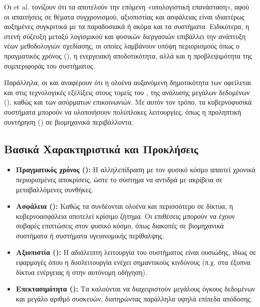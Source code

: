 Οι  et al. \cite{Rajkumar2010} τονίζουν ότι τα  αποτελούν την επόμενη
«υπολογιστική επανάσταση», αφού οι απαιτήσεις σε θέματα συγχρονισμού, αξιοπιστίας και
ασφάλειας είναι ιδιαιτέρως αυξημένες συγκριτικά με τα παραδοσιακά  ή ακόμα και τα
 συστήματα. Ειδικότερα, η στενή σύζευξη μεταξύ λογισμικού και φυσικών διεργασιών
επιβάλλει την ανάπτυξη νέων μεθοδολογιών σχεδίασης, οι οποίες λαμβάνουν υπόψη περιορισμούς
όπως ο πραγματικός χρόνος (), η ενεργειακή αποδοτικότητα, αλλά και η
προβλεψιμότητα της συμπεριφοράς του συστήματος.

Παράλληλα, οι  και  \cite{Baheti2011} αναφέρουν ότι η ολοένα αυξανόμενη
δημοτικότητα των  οφείλεται και στις τεχνολογικές εξελίξεις στους τομείς του
, της ανάλυσης μεγάλων δεδομένων (), καθώς και των
ασύρματων επικοινωνιών. Με αυτόν τον τρόπο, τα κυβερνοφυσικά συστήματα μπορούν να
υλοποιήσουν πολύπλοκες λειτουργίες, όπως η προληπτική συντήρηση ()
σε βιομηχανικά περιβάλλοντα.

\subsection*{Βασικά Χαρακτηριστικά και Προκλήσεις}

\begin{itemize}
    \item \textbf{Πραγματικός χρόνος ():} Η αλληλεπίδραση με τον φυσικό κόσμο
    απαιτεί χρονικά περιορισμένες αποκρίσεις, ώστε το σύστημα να αντιδρά με ακρίβεια σε
    μεταβαλλόμενες συνθήκες.
    \item \textbf{Ασφάλεια ():} Καθώς τα  συνδέονται ολοένα και περισσότερο
    σε δίκτυα, η κυβερνοασφάλεια αποτελεί κρίσιμο ζήτημα. Οι επιθέσεις μπορούν να έχουν
    σοβαρές επιπτώσεις στον φυσικό κόσμο, όπως διακοπές σε βιομηχανικά συστήματα ή
    συστήματα υγειονομικής περίθαλψης.
    \item \textbf{Αξιοπιστία ():} Η αδιάλειπτη λειτουργία του συστήματος
    είναι ουσιώδης, ιδίως σε εφαρμογές όπου η δυσλειτουργία ενέχει σημαντικούς κινδύνους
    (π.χ. στα έξυπνα δίκτυα ενέργειας ή στην αυτόνομη οδήγηση).
    \item \textbf{Επεκτασιμότητα ():} Τα  καλούνται να διαχειριστούν
    μεγάλους όγκους δεδομένων και μεγάλο αριθμό συσκευών, διατηρώντας παράλληλα υψηλά
    επίπεδα απόδοσης.
\end{itemize}

